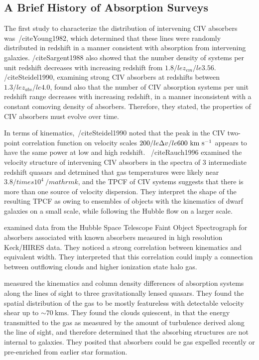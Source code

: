 
\subsection{A Brief History of {\CIV} Absorption Surveys}
\label{chp1:civbackground}

The first study to characterize the distribution of intervening CIV absorbers was~/cite{Young1982}, which determined that these lines were randomly distributed in redshift in a manner consistent with absorption from intervening galaxies. /cite{Sargent1988} also showed that the number density of systems per unit redshift decreases with increasing redshift from $1.8 /le z_{em} /le 3.56$. /cite{Steidel1990}, examining strong CIV absorbers at redshifts between $1.3 /le z_{abs} /le 4.0$, found also that the number of CIV absorption systems per unit redshift range decreases with increasing redshift, in a manner inconsistent with a constant comoving density of absorbers. Therefore, they stated, the properties of CIV absorbers must evolve over time.

In terms of kinematics,~/cite{Steidel1990} noted that the peak in the CIV two-point correlation function on velocity scales $200 /le \Delta v /le 600~{\hbox{km~s$^{-1}$}}$ appears to have the same power at low and high redshift. ~/cite{Rauch1996} examined the velocity structure of intervening CIV absorbers in the spectra of 3 intermediate redshift quasars and detrmined that gas temperatures were likely near $3.8 /times 10^4~/mathrm{k}$, and the TPCF of CIV systems suggests that there is more than one source of velocity dispersion. They interpret the shape of the resulting TPCF as owing to ensembles of objects with the kinematics of dwarf galaxies on a small scale, while following the Hubble flow on a larger scale. %

\cite{Churchill1999} examined data from the Hubble Space Telescope Faint Object Spectrograph for {\CIV} absorbers associated with known {\MgII} absorbers measured in high resolution Keck/HIRES data. They noticed a strong correlation between {\MgII} kinematics and {\CIV} equivalent width. They interpreted that this correlation could imply a connection between outflowing {\MgII} clouds and higher ionization state halo gas.

\cite{Rauch2001} measured the kinematics and column density differences of {\CIV} absorption systems along the lines of sight to three gravitationally lensed quasars. They found the spatial distribution of the gas to be mostly featureless with detectable velocity shear up to $\sim70~\mathrm{kms}$. They found the clouds quiescent, in that the energy transmitted to the gas as measured by the amount of turbulence derived along the line of sight, and therefore determined that the absorbing structures are not internal to galaxies. They posited that {\CIV} absorbers could be gas expelled recently or pre-enriched from earlier star formation.


